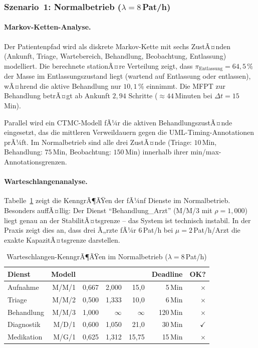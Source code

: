 ﻿\documentclass[a4paper,12pt]{scrreprt}
\theoremstyle{definition}
\begin{document}
\subsubsection{Szenario~1: Normalbetrieb ($\lambda = 8$\,Pat/h)}

\paragraph{Markov-Ketten-Analyse.}
Der Patientenpfad wird als diskrete Markov-Kette mit sechs ZustÃ¤nden
(Ankunft, Triage, Wartebereich, Behandlung, Beobachtung, Entlassung)
modelliert. Die berechnete stationÃ¤re Verteilung zeigt, dass
$\pi_\text{Entlassung} = 64{,}5\,\%$ der Masse im Entlassungszustand liegt
(wartend auf Entlassung oder entlassen), wÃ¤hrend die aktive Behandlung nur
$10{,}1\,\%$ einnimmt. Die MFPT zur Behandlung betrÃ¤gt ab Ankunft
$2{,}94$ Schritte ($\approx 44$\,Minuten bei $\Delta t = 15$\,Min).

Parallel wird ein CTMC-Modell fÃ¼r die aktiven BehandlungszustÃ¤nde
eingesetzt, das die mittleren Verweildauern gegen die UML-Timing-Annotationen
prÃ¼ft. Im Normalbetrieb sind alle drei ZustÃ¤nde (Triage: $10$\,Min,
Behandlung: $75$\,Min, Beobachtung: $150$\,Min) innerhalb ihrer
min/max-Annotationsgrenzen.

\paragraph{Warteschlangenanalyse.}
Tabelle~\ref{tab:wq-normal} zeigt die KenngrÃ¶ÃŸen der fÃ¼nf Dienste im
Normalbetrieb. Besonders auffÃ¤llig: Der Dienst ``Behandlung\_Arzt'' (M/M/3
mit $\rho = 1{,}000$) liegt genau an der StabilitÃ¤tsgrenze -- das System
ist technisch instabil. In der Praxis zeigt dies an, dass drei Ã„rzte
fÃ¼r $6$\,Pat/h bei $\mu = 2$\,Pat/h/Arzt die exakte KapazitÃ¤tsgrenze darstellen.

\begin{table}[H]
	\centering
	\begin{tabular}{@{}lrrrrrr@{}}
		\toprule
		\textbf{Dienst} & \textbf{Modell} & \boldmath{$\rho$} &
		\boldmath{$L$} & \boldmath{$W$\,(Min)} & \textbf{Deadline} & \textbf{OK?} \\
		\midrule
		Aufnahme        & M/M/1   & 0{,}667 & 2{,}000 &  15{,}0 & 5\,Min  & $\times$ \\
		Triage          & M/M/2   & 0{,}500 & 1{,}333 &  10{,}0 & 6\,Min  & $\times$ \\
		Behandlung      & M/M/3   & 1{,}000 & $\infty$& $\infty$& 120\,Min& $\times$ \\
		Diagnostik      & M/D/1   & 0{,}600 & 1{,}050 &  21{,}0 & 30\,Min & $\checkmark$ \\
		Medikation      & M/G/1   & 0{,}625 & 1{,}312 &  15{,}75& 15\,Min & $\times$ \\
		\bottomrule
	\end{tabular}
	\caption{Warteschlangen-KenngrÃ¶ÃŸen im Normalbetrieb ($\lambda=8$\,Pat/h)}
	\label{tab:wq-normal}
\end{table}
\end{document}
